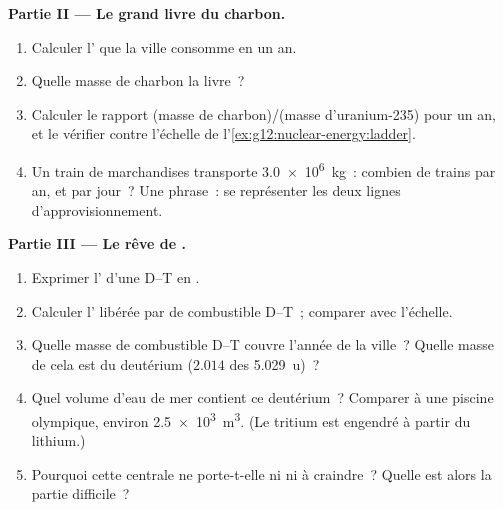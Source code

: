 \begin{problem}
\medskip
\noindent\textbf{Partie II --- Le grand livre du charbon.}
\begin{enumerate}[resume]
  \item Calculer l' que la ville
        consomme en un an.
  \item Quelle masse de charbon la livre~?
  \item Calculer le rapport (masse de charbon)/(masse d'uranium-235)
        pour un an, et le vérifier contre l'échelle de
        l'\cref{ex:g12:nuclear-energy:ladder}.
  \item Un train de marchandises transporte \qty{3.0e6}{kg}~: combien
        de trains par an, et par jour~? Une phrase~: se représenter
        les deux lignes d'approvisionnement.
\end{enumerate}

\medskip
\noindent\textbf{Partie III --- Le rêve de
.}
\begin{enumerate}[resume]
  \item Exprimer l' d'une
         D--T en .
  \item Calculer l' libérée par
         de combustible D--T~; comparer
        avec l'échelle.
  \item Quelle masse de combustible D--T couvre l'année de la ville~?
        Quelle masse de cela est du deutérium ($2.014$ des
        \qty{5.029}{u})~?
  \item Quel volume d'eau de mer contient ce deutérium~? Comparer à
        une piscine olympique, environ \qty{2.5e3}{m^3}. (Le tritium
        est engendré à partir du lithium.)
  \item Pourquoi cette centrale ne porte-t-elle ni
         ni
         à craindre~? Quelle est
        alors la partie difficile~?
\end{enumerate}


\end{problem}
